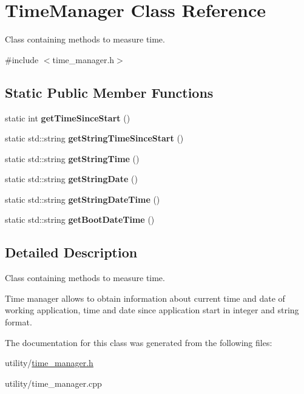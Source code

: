 \hypertarget{class_time_manager}{}\section{Time\+Manager Class Reference}
\label{class_time_manager}


Class containing methods to measure time.  




{\ttfamily \#include $<$time\+\_\+manager.\+h$>$}

\subsection*{Static Public Member Functions}
\begin{DoxyCompactItemize}
\item 
\hypertarget{class_time_manager_ad42a2f423c6c3310112abc3c5c742c9e}{}\label{class_time_manager_ad42a2f423c6c3310112abc3c5c742c9e} 
static int {\bfseries get\+Time\+Since\+Start} ()
\item 
\hypertarget{class_time_manager_aff5359efb14111764aa373367bafa9cc}{}\label{class_time_manager_aff5359efb14111764aa373367bafa9cc} 
static std\+::string {\bfseries get\+String\+Time\+Since\+Start} ()
\item 
\hypertarget{class_time_manager_a61b14a72a2f2de8405c8b6b8037561ac}{}\label{class_time_manager_a61b14a72a2f2de8405c8b6b8037561ac} 
static std\+::string {\bfseries get\+String\+Time} ()
\item 
\hypertarget{class_time_manager_ac67de828c7e298b8796c027cafde7479}{}\label{class_time_manager_ac67de828c7e298b8796c027cafde7479} 
static std\+::string {\bfseries get\+String\+Date} ()
\item 
\hypertarget{class_time_manager_a9811ffb8e35957521d0de842ca806206}{}\label{class_time_manager_a9811ffb8e35957521d0de842ca806206} 
static std\+::string {\bfseries get\+String\+Date\+Time} ()
\item 
\hypertarget{class_time_manager_ac9d0eb40ce9e29901f23d5b7b22712ff}{}\label{class_time_manager_ac9d0eb40ce9e29901f23d5b7b22712ff} 
static std\+::string {\bfseries get\+Boot\+Date\+Time} ()
\end{DoxyCompactItemize}


\subsection{Detailed Description}
Class containing methods to measure time. 

Time manager allows to obtain information about current time and date of working application, time and date since application start in integer and string format. 

The documentation for this class was generated from the following files\+:\begin{DoxyCompactItemize}
\item 
utility/\hyperlink{time__manager_8h}{time\+\_\+manager.\+h}\item 
utility/time\+\_\+manager.\+cpp\end{DoxyCompactItemize}
